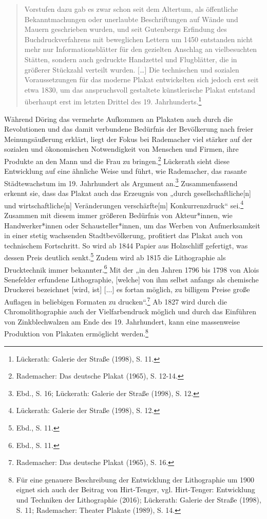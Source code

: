 \documentclass[a4paper,12pt,ngerman]{article}
\begin{document}
\blockquote{\fontsize{10pt}{12pt}\selectfont Vorstufen dazu gab es zwar schon seit dem Altertum, als öffentliche Bekanntmachungen oder unerlaubte Beschriftungen auf Wände und Mauern geschrieben wurden, und seit Gutenbergs Erfindung des Buchdruckverfahrens mit beweglichen Lettern um 1450 entstanden nicht mehr nur Informationsblätter für den gezielten Anschlag an vielbesuchten Stätten, sondern auch gedruckte Handzettel und Flugblätter, die in größerer Stückzahl verteilt wurden. […] Die technischen und sozialen Voraussetzungen für das moderne Plakat entwickelten sich jedoch erst seit etwa 1830, um das anspruchsvoll gestaltete künstlerische Plakat entstand überhaupt erst im letzten Drittel des 19. Jahrhunderts.\footnote{Lückerath: Galerie der Straße (1998), S. 11.}\\}

Während Döring das vermehrte Aufkommen an Plakaten auch durch die Revolutionen und das damit verbundene Bedürfnis der Bevölkerung nach freier Meinungsäußerung erklärt, liegt der Fokus bei Rademacher viel stärker auf der sozialen und ökonomischen Notwendigkeit von Menschen und Firmen, ihre Produkte an den Mann und die Frau zu bringen.\footnote{Rademacher: Das deutsche Plakat (1965), S. 12-14.}  Lückerath sieht diese Entwicklung auf eine ähnliche Weise und führt, wie Rademacher, das rasante Städtewachstum im 19. Jahrhundert als Argument an.\footnote{Ebd., S. 16; Lückerath: Galerie der Straße (1998), S. 12.}  Zusammenfassend erkennt sie, dass das Plakat auch das Erzeugnis von „durch gesellschaftliche[n] und wirtschaftliche[n] Veränderungen verschärfte[m] Konkurrenzdruck“ sei.\footnote{Lückerath: Galerie der Straße (1998), S. 12.} \\
Zusammen mit diesem immer größeren Bedürfnis von Akteur*innen, wie Handwerker*innen oder Schausteller*innen, um das Werben von Aufmerksamkeit in einer stetig wachsenden Stadtbevölkerung, profitiert das Plakat auch von technischem Fortschritt. So wird ab 1844 Papier aus Holzschliff gefertigt, was dessen Preis deutlich senkt.\footnote{Ebd., S. 11.} Zudem wird ab 1815 die Lithographie als Drucktechnik immer bekannter.\footnote{Ebd., S. 11.}  Mit der „in den Jahren 1796 bis 1798 von Alois Senefelder erfundene Lithographie, [welche] von ihm selbst anfangs als chemische Druckerei bezeichnet [wird, ist] [...] es fortan möglich, zu billigem Preise große Auflagen in beliebigen Formaten zu drucken“.\footnote{Rademacher: Das deutsche Plakat (1965), S. 16.} Ab 1827 wird durch die Chromolithographie auch der Vielfarbendruck möglich und durch das Einführen von Zinkblechwalzen am Ende des 19. Jahrhundert, kann eine massenweise Produktion von Plakaten ermöglicht werden.\footnote{Für eine genauere Beschreibung der Entwicklung der Lithographie um 1900 eignet sich auch der Beitrag von Hirt-Tenger, vgl. Hirt-Tenger: Entwicklung und Techniken der Lithographie (2016); Lückerath: Galerie der Straße (1998), S. 11; Rademacher: Theater Plakate (1989), S. 14.} \\ 
\end{document}
